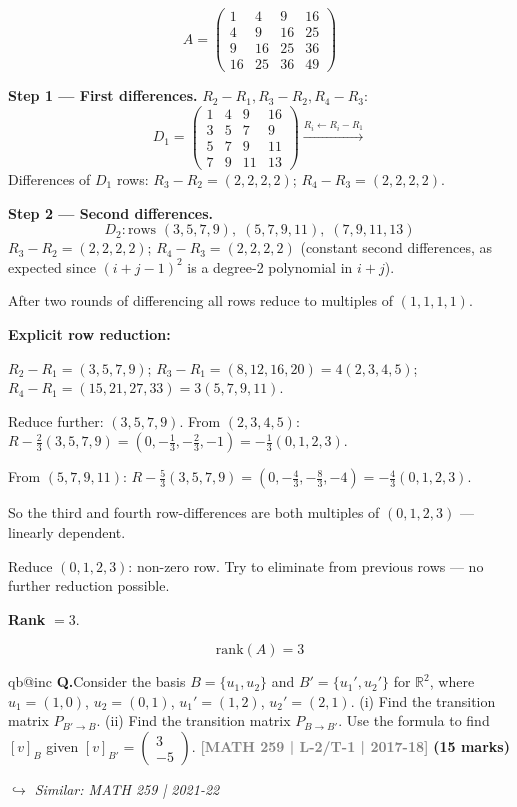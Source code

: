 \documentclass[12pt,a3paper]{article}
\makeatletter
\newcommand{\yr}[1]{\hfill\textcolor{gray}{\small\textbf{[#1]}}}
\newcommand{\mk}[1]{\textcolor{orange!70!black}{\small\textbf{(#1 marks)}}}
\newcommand{\variant}[1]{\par\vspace{1pt}\textcolor{blue!50!black}%
  {\footnotesize\textit{$\hookrightarrow$ Similar: #1}}}
\newcounter{qnum}
\newcommand{\Q}[1]{%
  \csname qb@inc\endcsname
  \needspace{4\baselineskip}
  \refstepcounter{qnum}
  \vspace{6pt}
  \noindent\textbf{Q\theqnum.}\enspace #1\par
}
\makeatother
\begin{document}
\begin{tcolorbox}[enhanced,breakable,colback=cC!4,colframe=cC,
  boxrule=0.8pt,arc=5pt,
  title={\textbf{Answer}},
  fonttitle=\bfseries\color{white},colbacktitle=cC]

\[
A=\begin{pmatrix}1&4&9&16\\4&9&16&25\\9&16&25&36\\16&25&36&49\end{pmatrix}
\]

\textbf{Step 1 --- First differences.} $R_2-R_1,R_3-R_2,R_4-R_3$:
\[
D_1=\begin{pmatrix}1&4&9&16\\3&5&7&9\\5&7&9&11\\7&9&11&13\end{pmatrix}
\xrightarrow{R_i\leftarrow R_i-R_1}
\]
Differences of $D_1$ rows: $R_3-R_2=(2,2,2,2)$; $R_4-R_3=(2,2,2,2)$.

\textbf{Step 2 --- Second differences.}
\[
D_2: \text{rows }(3,5,7,9),\;(5,7,9,11),\;(7,9,11,13)
\]
$R_3-R_2=(2,2,2,2)$; $R_4-R_3=(2,2,2,2)$ (constant second differences, as expected since $(i+j-1)^2$ is a degree-2 polynomial in $i+j$).

After two rounds of differencing all rows reduce to multiples of $(1,1,1,1)$.

\textbf{Explicit row reduction:}

$R_2-R_1=(3,5,7,9)$; $R_3-R_1=(8,12,16,20)=4(2,3,4,5)$; $R_4-R_1=(15,21,27,33)=3(5,7,9,11)$.

Reduce further: $(3,5,7,9)$. From $(2,3,4,5)$: $R-\tfrac{2}{3}(3,5,7,9)=(0,-\tfrac{1}{3},-\tfrac{2}{3},-1)=-\tfrac{1}{3}(0,1,2,3)$.

From $(5,7,9,11)$: $R-\tfrac{5}{3}(3,5,7,9)=(0,-\tfrac{4}{3},-\tfrac{8}{3},-4)=-\tfrac{4}{3}(0,1,2,3)$.

So the third and fourth row-differences are both multiples of $(0,1,2,3)$ --- linearly dependent.

Reduce $(0,1,2,3)$: non-zero row. Try to eliminate from previous rows --- no further reduction possible.

\textbf{Rank} $= 3$.

\[
\boxed{\mathrm{rank}(A)=3}
\]
\end{tcolorbox}

\Q{Consider the basis $B = \{u_1, u_2\}$ and $B' = \{u_1', u_2'\}$ for $\mathbb{R}^2$, where $u_1 = (1,0)$, $u_2 = (0,1)$, $u_1' = (1,2)$, $u_2' = (2,1)$. (i) Find the transition matrix $P_{B' \to B}$. (ii) Find the transition matrix $P_{B \to B'}$. Use the formula to find $[v]_B$ given $[v]_{B'} = \begin{pmatrix} 3 \\ -5 \end{pmatrix}$.
\yr{MATH 259 | L-2/T-1 | 2017-18} \mk{15}
\variant{MATH 259 | 2021-22}}
\end{document}
